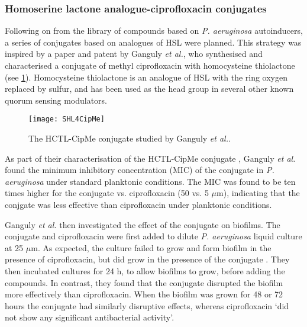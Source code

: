 \subsubsection{Homoserine lactone analogue-ciprofloxacin conjugates\label{sec:AIA_intro}}

Following on from the library of compounds based on \textit{P. aeruginosa} autoinducers, a series of conjugates based on analogues of HSL were planned. This strategy was inspired by a paper\cite{Ganguly2011} and patent\cite{Iyer2012} by Ganguly \textit{et al.}, who synthesised and characterised a conjugate  of methyl ciprofloxacin with homocysteine thiolactone (see \ref{fgr:SHL4CipMe}). Homocysteine thiolactone is an analogue of HSL with the ring oxygen replaced by sulfur, and has been used as the head group in several other known quorum sensing modulators\cite{Eberhard1986,Schaefer1996,Passador1996,Smith2003,Chhabra1993,McInnis2011,Geske2007,Janssens2007}.


\begin{figure}[H]
	\begin{center}
		\texttt{[image: SHL4CipMe]}
		\caption{The HCTL-CipMe conjugate  studied by Ganguly \textit{et al.}\cite{Ganguly2011,Iyer2012}.\label{fgr:SHL4CipMe}}
	\end{center}
\end{figure}


As part of their characterisation of the HCTL-CipMe conjugate , Ganguly \textit{et al.} found the minimum inhibitory concentration (MIC) of the conjugate in \textit{P. aeruginosa} under standard planktonic conditions. 
The MIC was found to be ten times higher for the conjugate vs. ciprofloxacin (50 vs. 5 $\mu$m), indicating that the conjgate was less effective than ciprofloxacin under planktonic conditions. 

Ganguly \textit{et al.} then investigated the effect of the conjugate on biofilms. 
The conjugate and ciprofloxacin were first added to dilute \textit{P. aeruginosa} liquid culture at 25 $\mu$m. 
As expected, the culture failed to grow and form biofilm in the presence of ciprofloxacin, but did grow in the presence of the conjugate . 
They then incubated cultures for 24 h, to allow biofilms to grow, before adding the compounds. In contrast, they found that the conjugate  disrupted the biofilm more effectively than ciprofloxacin. 
When the biofilm was grown for 48 or 72 hours the conjugate had similarly disruptive effects, whereas ciprofloxacin `did not show any significant antibacterial activity'.

